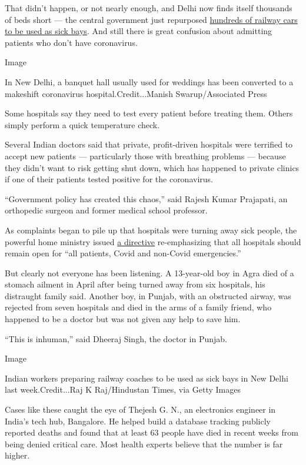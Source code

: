 That didn't happen, or not nearly enough, and Delhi now finds itself
thousands of beds short --- the central government just repurposed
\href{https://www.cbsnews.com/news/coronavirus-in-india-delhi-cases-surge-train-cars-and-hotels-converted-emergency-hospital-2020-06-17/}{hundreds
of railway cars to be used as sick bays}. And still there is great
confusion about admitting patients who don't have coronavirus.

Image

In New Delhi, a banquet hall usually used for weddings has been
converted to a makeshift coronavirus hospital.Credit...Manish
Swarup/Associated Press

Some hospitals say they need to test every patient before treating them.
Others simply perform a quick temperature check.

Several Indian doctors said that private, profit-driven hospitals were
terrified to accept new patients --- particularly those with breathing
problems --- because they didn't want to risk getting shut down, which
has happened to private clinics if one of their patients tested positive
for the coronavirus.

``Government policy has created this chaos,'' said Rajesh Kumar
Prajapati, an orthopedic surgeon and former medical school professor.

As complaints began to pile up that hospitals were turning away sick
people, the powerful home ministry issued
\href{https://www.mha.gov.in/sites/default/files/PR_HSLettertoStatesUTsonMovementofMedicalProfeesionals_11052020.pdf}{a
directive} re-emphasizing that all hospitals should remain open for
``all patients, Covid and non-Covid emergencies.''

But clearly not everyone has been listening. A 13-year-old boy in Agra
died of a stomach ailment in April after being turned away from six
hospitals, his distraught family said. Another boy, in Punjab, with an
obstructed airway, was rejected from seven hospitals and died in the
arms of a family friend, who happened to be a doctor but was not given
any help to save him.

``This is inhuman,'' said Dheeraj Singh, the doctor in Punjab.

Image

Indian workers preparing railway coaches to be used as sick bays in New
Delhi last week.Credit...Raj K Raj/Hindustan Times, via Getty Images

Cases like these caught the eye of Thejesh G. N., an electronics
engineer in India's tech hub, Bangalore. He helped build a database
tracking publicly reported deaths and found that at least 63 people have
died in recent weeks from being denied critical care. Most health
experts believe that the number is far higher.

